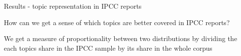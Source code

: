 \documentclass[9pt]{beamer}
\begin{document}
%
%
%
%
%

%
%
%

\begin{frame}{Results - topic representation in IPCC reports}

How can we get a sense of which topics are better covered in IPCC reports?

\medskip

We get a measure of proportionality between two distributions by dividing the each topics share in the IPCC sample by its share in the whole corpus


\end{frame}
\end{document}
